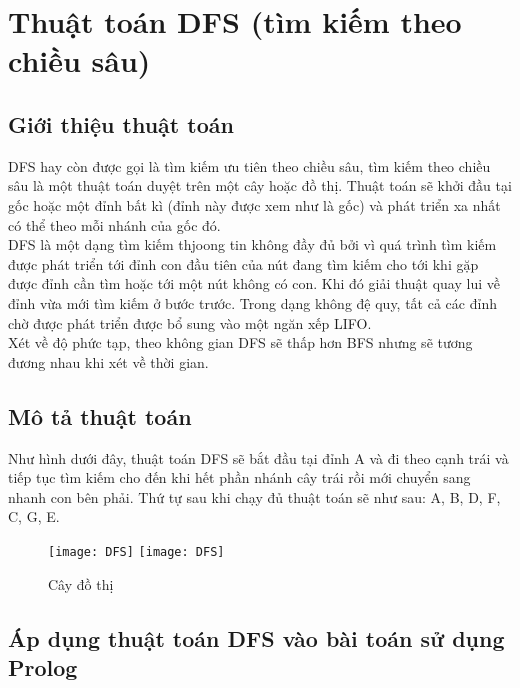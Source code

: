 \chapter{Thuật toán DFS (tìm kiếm theo chiều sâu)}
\ifpdf
    \graphicspath{{Chapter3/Chapter3Figs/PNG/}{Chapter3/Chapter3Figs/PDF/}{Chapter3/Chapter3Figs/}}
\else
    \graphicspath{{Chapter3/Chapter3Figs/EPS/}{Chapter3/Chapter3Figs/}}
\fi


\section{Giới thiệu thuật toán}
DFS hay còn được gọi là tìm kiếm ưu tiên theo chiều sâu, tìm kiếm theo chiều sâu là một thuật toán duyệt trên một cây hoặc đồ thị. Thuật toán sẽ khởi đầu tại gốc hoặc một đỉnh bất kì (đỉnh này được xem như là gốc) và phát triển xa nhất có thể theo mỗi nhánh của gốc đó.\\
DFS là một dạng tìm kiếm thjoong tin không đầy đủ bởi vì quá trình tìm kiếm được phát triển tới đỉnh con đầu tiên của nút đang tìm kiếm cho tới khi gặp được đỉnh cần tìm hoặc tới một nút không có con. Khi đó giải thuật quay lui về đỉnh vừa mới tìm kiếm ở bước trước. Trong dạng không đệ quy, tất cả các đỉnh chờ được phát triển được bổ sung vào một ngăn xếp LIFO.
\\ Xét về độ phức tạp, theo không gian DFS sẽ thấp hơn BFS nhưng sẽ tương đương nhau khi xét về thời gian.
\section{Mô tả thuật toán}
Như hình dưới đây, thuật toán DFS sẽ bắt đầu tại đỉnh A và đi theo cạnh trái và tiếp tục tìm kiếm cho đến khi hết phần nhánh cây trái rồi mới chuyển sang nhanh con bên phải. Thứ tự sau khi chạy đủ thuật toán sẽ như sau: A, B, D, F,  C, G, E.\\

\begin{figure}[!htbp]
  \begin{center}
    \leavevmode
    \ifpdf
      \texttt{[image: DFS]}
    \else
      \texttt{[image: DFS]}
    \fi
    \caption{Cây đồ thị}
    \label{FigAir}
  \end{center}
\end{figure}

\section{Áp dụng thuật toán DFS vào bài toán sử dụng Prolog}
